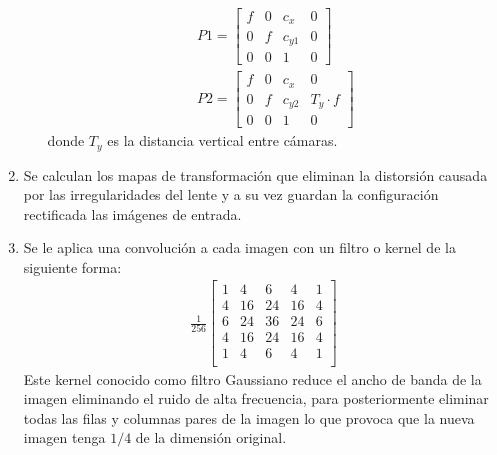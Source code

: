 \begin{enumerate}
\begin{itemize}
\begin{align}
           P1 = \begin{bmatrix}
            f & 0 & c_{x} & 0\\
            0 & f & c_{y1} & 0\\
            0 & 0 & 1 & 0
            \end{bmatrix}\\
            P2 = \begin{bmatrix}
             f & 0 & c_{x} & 0\\
            0 & f & c_{y2} & T_{y} \cdot f\\
            0 & 0 & 1 & 0
            \end{bmatrix}
        \end{align}
        donde $T_{y}$ es la distancia vertical entre cámaras.
    \end{itemize}
    \item Se calculan los mapas de transformación que eliminan la distorsión causada por las irregularidades del lente y a su vez guardan la configuración rectificada las imágenes de entrada.
    \item Se le aplica una convolución a cada imagen con un filtro o kernel de la siguiente forma:
    \begin{align}
        \frac{1}{256}\begin{bmatrix}
            1 & 4 & 6 & 4 & 1\\
            4 & 16 & 24 & 16 & 4\\
            6 & 24 & 36 & 24 & 6\\
            4 & 16 & 24 & 16 & 4\\
            1 & 4 & 6 & 4 & 1\\
            \end{bmatrix}
    \end{align}
   Este kernel conocido como filtro Gaussiano reduce el ancho de banda de la imagen eliminando el ruido de alta frecuencia, para posteriormente eliminar todas las filas y columnas pares de la imagen lo que provoca que la nueva imagen tenga $1/4$ de la dimensión original.
\end{enumerate}
